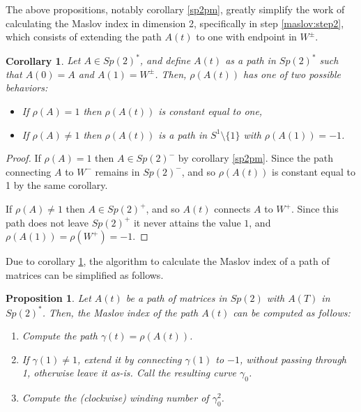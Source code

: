 \documentclass{article}
\newtheorem{prop}{Proposition}
\newtheorem{corollary}{Corollary}
\theoremstyle{nonumberplain}
\newtheorem{proof}{Proof}
\begin{document}
The above propositions, notably corollary \ref{sp2pm}, greatly simplify the work of calculating the Maslov index in dimension 2, specifically in step \ref{maslov:step2}, which consists of extending the path $A(t)$ to one with endpoint in $W^\pm$.

\begin{corollary}\label{sp2rhoextension}
Let $A \in Sp(2)^*$, and define $A(t)$ as a path in $Sp(2)^*$ such that $A(0) = A$ and $A(1) = W^\pm$. Then, $\rho(A(t))$ has one of two possible behaviors:
\begin{itemize}
\item If $\rho(A) = 1$ then $\rho(A(t))$ is constant equal to one,
\item If $\rho(A) \neq 1$ then $\rho(A(t))$ is a path in $S^1 \setminus \{1\}$ with $\rho(A(1)) = -1$.
\end{itemize}
\end{corollary}

\begin{proof}
If $\rho(A) = 1$ then $A \in Sp(2)^-$ by corollary \ref{sp2pm}. Since the path connecting $A$ to $W^-$ remains in $Sp(2)^-$, and so $\rho(A(t))$ is constant equal to 1 by the same corollary.

If $\rho(A) \neq 1$ then $A \in Sp(2)^+$, and so $A(t)$ connects $A$ to $W^+$. Since this path does not leave $Sp(2)^+$ it never attains the value $1$, and $\rho(A(1)) = \rho(W^+) = -1$.
\end{proof}

Due to corollary \ref{sp2rhoextension}, the algorithm to calculate the Maslov index of a path of matrices can be simplified as follows.

\begin{prop}
Let $A(t)$ be a path of matrices in $Sp(2)$ with $A(T)$ in $Sp(2)^*$. Then, the Maslov index of the path $A(t)$ can be computed as follows:

\begin{enumerate}[algorithm]
\item Compute the path $\gamma(t) = \rho(A(t))$. 
\item If $\gamma(1) \neq 1$, extend it by connecting $\gamma(1)$ to $-1$, without passing through 1, otherwise leave it as-is. Call the resulting curve $\gamma_0$.
\item Compute the (clockwise) winding number of $\gamma_0^2$.
\end{enumerate}
\end{prop}
\end{document}

